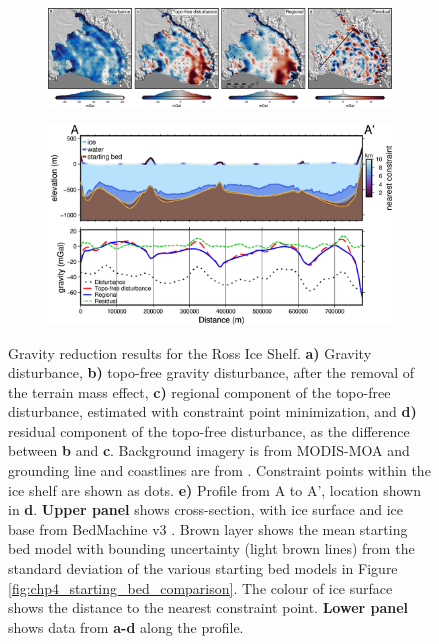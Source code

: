 \begin{figure}[!ht]
  \centering
    \begin{subfigure}[t]{.99\textwidth}
        \centering
        \includegraphics[width=\textwidth]{figures/chp4/RIS_terrain_regional.png}
    \end{subfigure}
    \begin{subfigure}[t]{.8\textwidth}
        \addtocounter{subfigure}{4}
        \centering
        \includegraphics[width=\textwidth]{figures/chp4/RIS_terrain_regional_profile.png}
        \caption{}
    \end{subfigure}
  \caption[Gravity reduction results for the Ross Ice Shelf]{Gravity reduction results for the Ross Ice Shelf. \textbf{a)} Gravity disturbance, \textbf{b)} topo-free gravity disturbance, after the removal of the terrain mass effect, \textbf{c)} regional component of the topo-free disturbance, estimated with constraint point minimization, and \textbf{d)} residual component of the topo-free disturbance, as the difference between \textbf{b} and \textbf{c}. Background imagery is from MODIS-MOA \citep{scambosmodisbased2007} and grounding line and coastlines are from \citep{morlighemmeasures2022}. Constraint points within the ice shelf are shown as dots. \textbf{e)} Profile from A to A', location shown in \textbf{d}. \textbf{Upper panel} shows cross-section, with ice surface and ice base from BedMachine v3 \citep{morlighemdeep2020, morlighemmeasures2022}. Brown layer shows the mean starting bed model with bounding uncertainty (light brown lines) from the standard deviation of the various starting bed models in Figure \ref{fig:chp4_starting_bed_comparison}. The colour of ice surface shows the distance to the nearest constraint point. \textbf{Lower panel} shows data from \textbf{a-d} along the profile.}
    \label{fig:chp4_RIS_terrain_regional_residual}
\end{figure}

